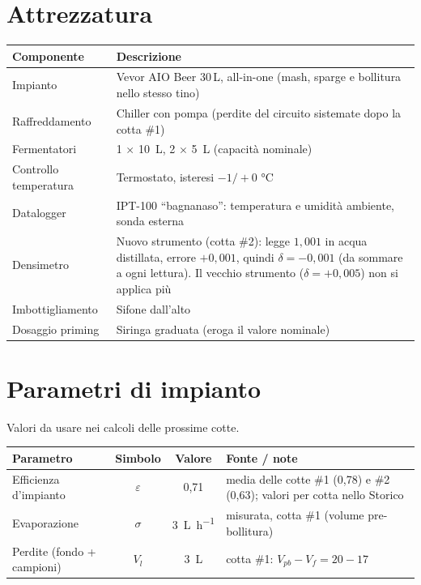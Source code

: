 
\section{Attrezzatura}

\begin{tabularx}{\linewidth}{@{}lX@{}}
\toprule
Componente & Descrizione \\
\midrule
Impianto & Vevor AIO Beer 30\,L, all-in-one (mash, sparge e bollitura nello stesso tino) \\
Raffreddamento & Chiller con pompa (perdite del circuito sistemate dopo la cotta \#1) \\
Fermentatori & 1 $\times$ \SI{10}{\liter}, 2 $\times$ \SI{5}{\liter} (capacità nominale) \\
Controllo temperatura & Termostato, isteresi $-1/+0$ \si{\celsius} \\
Datalogger & IPT-100 ``bagnanaso'': temperatura e umidità ambiente, sonda esterna \\
Densimetro & Nuovo strumento (cotta \#2): legge $1{,}001$ in acqua distillata, errore $+0{,}001$, quindi $\delta = -0{,}001$ (da sommare a ogni lettura). Il vecchio strumento ($\delta = +0{,}005$) non si applica più \\
Imbottigliamento & Sifone dall'alto \\
Dosaggio priming & Siringa graduata (eroga il valore nominale) \\
\bottomrule
\end{tabularx}

\section{Parametri di impianto}

Valori da usare nei calcoli delle prossime cotte.

\medskip
\begin{tabularx}{\linewidth}{@{}lccX@{}}
\toprule
Parametro & Simbolo & Valore & Fonte / note \\
\midrule
Efficienza d'impianto & $\varepsilon$ & 0,71 & media delle cotte \#1 (0,78) e \#2 (0,63); valori per cotta nello Storico \\
Evaporazione & $\sigma$ & \SI{3}{\liter\per\hour} & misurata, cotta \#1 (volume pre-bollitura) \\
Perdite (fondo + campioni) & $V_l$ & \SI{3}{\liter} & cotta \#1: $V_{pb} - V_f = 20 - 17$ \\
\bottomrule
\end{tabularx}


